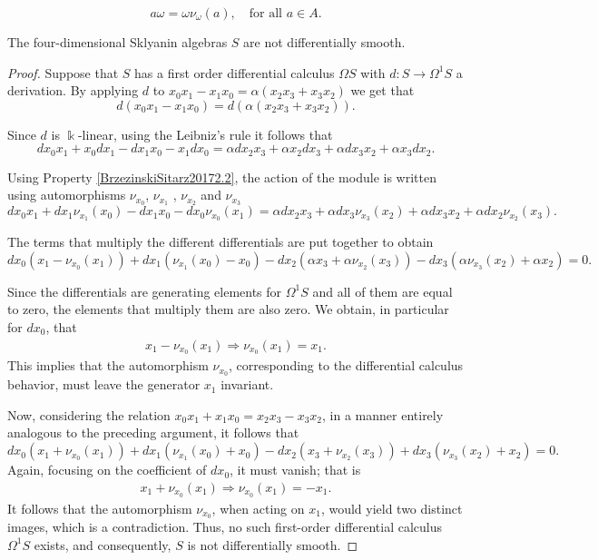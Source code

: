 \documentclass[10pt,a4paper]{amsart}
\begin{document}
\begin{equation}\label{BrzezinskiSitarz20172.2}
    a \omega = \omega \nu_{\omega}(a), \quad \text{for all } a \in A.
\end{equation}

\begin{theorem}\label{NODS4Skly} 
The four-dimensional Sklyanin algebras $S$ are not differentially smooth.
\end{theorem}

\begin{proof}
Suppose that $S$ has a first order differential calculus $\Omega S$ with $d: S \rightarrow \Omega^1S$ a derivation. By applying $d$ to $x_0 x_1  - x_1 x_0 =   \alpha(x_2x_3 + x_3x_2)$ we get that 
\[
d(x_0 x_1  - x_1 x_0) =  d(\alpha(x_2x_3 + x_3x_2)).
\]

Since $d$ is $\Bbbk$-linear, using the Leibniz's rule it follows that
\[
dx_0 x_1+x_0dx_1  - dx_1 x_0-x_1dx_0 =  \alpha dx_2x_3 +\alpha x_2dx_3 + \alpha dx_3x_2 + \alpha x_3dx_2.
\]

Using Property \ref{BrzezinskiSitarz20172.2}, the action of the module is written using automorphisms $\nu_{x_0}$, $\nu_{x_1}$ , $\nu_{x_2}$ and $\nu_{x_3}$
{\small{\[
dx_0 x_1+dx_1\nu_{x_1}(x_0)  - dx_1 x_0-dx_0\nu_{x_0}(x_1) =  \alpha dx_2x_3 +\alpha dx_3\nu_{x_3}(x_2) + \alpha dx_3x_2 + \alpha dx_2\nu_{x_2}(x_3).
\]}}

The terms that multiply the different differentials are put together to obtain
\[
dx_0(x_1-\nu_{x_0}(x_1))+dx_1(\nu_{x_1}(x_0) - x_0) -dx_2(\alpha x_3+\alpha\nu_{x_2}(x_3))-dx_3(\alpha\nu_{x_3}(x_2)+\alpha x_2) = 0.
\]
 
Since the differentials are generating elements for $\Omega^1S$ and all of them are equal to zero, the elements that multiply them are also zero. We obtain, in particular for $dx_0$, that 
\begin{align*}
    x_1-\nu_{x_0}(x_1) \Rightarrow \nu_{x_0}(x_1)=x_1.
\end{align*}
This implies that the automorphism $\nu_{x_0}$, corresponding to the differential calculus behavior, must leave the generator $x_1$ invariant.

Now, considering the relation $x_0x_1 + x_1x_0 = x_2x_3 - x_3x_2$, in a manner entirely analogous to the preceding argument, it follows that
\[
dx_0(x_1+\nu_{x_0}(x_1))+dx_1(\nu_{x_1}(x_0) + x_0) -dx_2( x_3+\nu_{x_2}(x_3))+dx_3(\nu_{x_3}(x_2)+ x_2) = 0.
\]
Again, focusing on the coefficient of $dx_0$, it must vanish; that is
\begin{align*}
    x_1+\nu_{x_0}(x_1) \Rightarrow \nu_{x_0}(x_1)=-x_1.
\end{align*}
It follows that the automorphism $\nu_{x_0}$, when acting on $x_1$, would yield two distinct images, which is a contradiction. Thus, no such first-order differential calculus $\Omega^1 S$ exists, and consequently, $S$ is not differentially smooth.
\end{proof}
\end{document}
